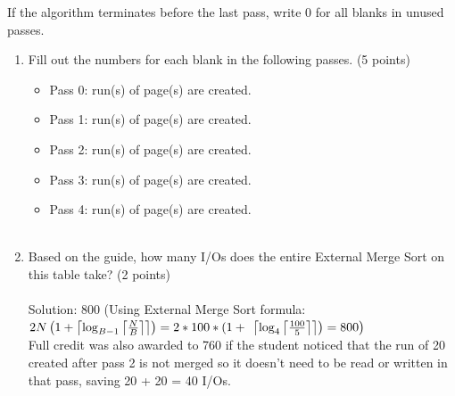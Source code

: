 \documentclass[10pt]{article}
\begin{document}
\begin{itemize}
    If the algorithm terminates before the last pass, write 0 for all blanks in unused passes. \\
    \begin{enumerate}
        \item Fill out the numbers for each blank in the following passes. (5 points)\\
        \begin{itemize}
            \item Pass 0: \underline{\quad{}\quad\quad} run(s) of \underline{\quad{}\quad\quad} page(s) are created.\\
            \item Pass 1: \underline{\quad{}\quad\quad} run(s) of \underline{\quad{}\quad\quad} page(s) are created.\\
            \item Pass 2: \underline{\quad{}\quad\quad} run(s) of \underline{\quad{}\quad\quad} page(s) are created.\\
            \item Pass 3: \underline{\quad{}\quad\quad} run(s) of \underline{\quad{}\quad\quad} page(s) are created.\\
            \item Pass 4: \underline{\quad{}\quad\quad} run(s) of \underline{\quad{}\quad\quad} page(s) are created.\\ \\
        \end{itemize}
        \item Based on the guide, how many I/Os does the entire External Merge Sort on this table take? (2 points)
        \\
        \\
        {\color{red}Solution: 800 (Using External Merge Sort formula: $2 N\left(1+\left\lceil\log _{B-1}\left\lceil\frac{N}{B}\right\rceil\right\rceil\right)=2 * 100 * ( 1 + \\
        \left.\left.\left\lceil\log _{4}\left\lceil\frac{100}{5}\right\rceil\right\rceil\right)=800\right)$\\
Full credit was also awarded to 760 if the student noticed that the run of 20 created after pass 2 is not merged so it doesn’t need to be read or written in that pass, saving 20 + 20 = 40 I/Os.}
        \\
    \end{enumerate}

\end{itemize}
\end{document}
